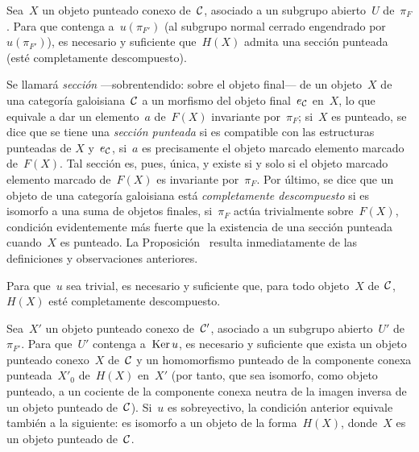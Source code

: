 
\begin{proposition}
\label{V.6.4}
Sea~$X$ un objeto punteado conexo de~$\cal C$, asociado a un subgrupo
abierto~$U$ de~$\pi_F$. Para que
contenga a~$u(\pi_{F'})$ (\resp al subgrupo normal cerrado engendrado
por~$u(\pi_{F'})$), es necesario y suficiente que~$H(X)$ admita una
sección punteada (\resp esté completamente descompuesto).
\end{proposition}

Se llamará \emph{sección} ---sobrentendido: sobre el objeto final--- de un
objeto~$X$ de una categoría galoisiana~$\cal C$ a un morfismo del objeto
final~$e_{\cal C}$ en~$X$, lo que equivale a dar un elemento~$a$ de~$F(X)$
invariante por~$\pi_F$; si~$X$ es punteado, se dice que se tiene una
\emph{sección punteada} si es compatible con las estructuras punteadas de
$X$ y~$e_{\cal C}$, \ie si~$a$ es precisamente el
{objeto marcado}
{elemento marcado}
de~$F(X)$. Tal sección es, pues, única, y existe si y solo si el
{objeto marcado}
{elemento marcado}
de~$F(X)$ es invariante por~$\pi_F$. Por último, se dice que un objeto de
una categoría galoisiana está \emph{completamente descompuesto}
%
%
si es isomorfo a una suma de objetos finales, \ie si~$\pi_F$ actúa
trivialmente sobre~$F(X)$, condición evidentemente más fuerte que la
existencia de una sección punteada cuando~$X$ es punteado. La
Proposición~ resulta inmediatamente de las definiciones y
observaciones anteriores.

\begin{corollaire}
\label{V.6.5}
Para
que~$u$ sea trivial, es necesario y suficiente que, para todo objeto~$X$
de~$\cal C$, $H(X)$ esté completamente descompuesto.
\end{corollaire}

\begin{proposition}
\label{V.6.6}
Sea~$X'$ un objeto punteado conexo de~$\cal C'$, asociado a un subgrupo
abierto~$U'$ de~$\pi_{F'}$. Para que~$U'$ contenga a~$\Ker u$, es necesario
y suficiente que exista un objeto punteado conexo~$X$ de~$\cal C$ y un
homomorfismo punteado de la componente conexa punteada~$X'_0$ de~$H(X)$
en~$X'$ (por tanto, que
sea isomorfo, como objeto punteado, a un cociente de la componente conexa
neutra de la imagen inversa de un objeto punteado de~$\cal C$). Si~$u$ es
sobreyectivo, la condición anterior equivale también a la siguiente:
es isomorfo a un objeto de la forma~$H(X)$, donde~$X$ es un objeto punteado
de~$\cal C$.
\end{proposition}

